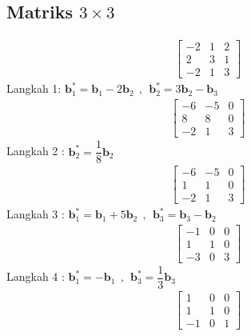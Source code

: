 		\subsection{Matriks $3\times3$}
				\begin{align*}
		\left[
		\begin{array}{rrr} 
			-2 & 1 & 2\\
			2 & 3 & 1\\
			-2 &1 & 3 
		\end{array} 
		\right]
	\end{align*}
Langkah 1: $\textbf{b}^*_1= \textbf{b}_1 - 2\textbf{b}_2~~,~~\textbf{b}^*_2= 3\textbf{b}_2 - \textbf{b}_3$ \\
\begin{align*}
\left[
\begin{array}{rrr} 
	-6 & -5 & 0\\
	8 & 8 & 0\\
	-2 &1 & 3 
\end{array} 
\right]
\end{align*}
Langkah 2 : $\textbf{b}^*_2= \dfrac{1}{8}\textbf{b}_2$ \\
\begin{align*}
\left[
\begin{array}{rrr} 
	-6 & -5 & 0\\
	1 & 1 & 0\\
	-2 &1 & 3 
\end{array} 
\right]
\end{align*}
Langkah 3 : $\textbf{b}^*_1= \textbf{b}_1 + 5\textbf{b}_2~~,~~\textbf{b}^*_3= \textbf{b}_3 - \textbf{b}_2$ \\
\begin{align*}
\left[
\begin{array}{rrr} 
	-1 & 0 & 0\\
	1 & 1 & 0\\
	-3 &0 & 3 
\end{array} 
\right]
\end{align*}
Langkah 4 : $\textbf{b}^*_1= -\textbf{b}_1~~,~~\textbf{b}^*_3= \dfrac{1}{3}\textbf{b}_3$ \\
\begin{align*}
	\left[
	\begin{array}{rrr} 
		1 & 0 & 0\\
		1 & 1 & 0\\
		-1 &0 & 1 
	\end{array} 
	\right]
\end{align*}
